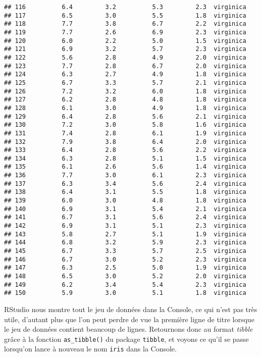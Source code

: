 \documentclass[
]{book}
\begin{document}
\begin{verbatim}
## 116          6.4         3.2          5.3         2.3  virginica
## 117          6.5         3.0          5.5         1.8  virginica
## 118          7.7         3.8          6.7         2.2  virginica
## 119          7.7         2.6          6.9         2.3  virginica
## 120          6.0         2.2          5.0         1.5  virginica
## 121          6.9         3.2          5.7         2.3  virginica
## 122          5.6         2.8          4.9         2.0  virginica
## 123          7.7         2.8          6.7         2.0  virginica
## 124          6.3         2.7          4.9         1.8  virginica
## 125          6.7         3.3          5.7         2.1  virginica
## 126          7.2         3.2          6.0         1.8  virginica
## 127          6.2         2.8          4.8         1.8  virginica
## 128          6.1         3.0          4.9         1.8  virginica
## 129          6.4         2.8          5.6         2.1  virginica
## 130          7.2         3.0          5.8         1.6  virginica
## 131          7.4         2.8          6.1         1.9  virginica
## 132          7.9         3.8          6.4         2.0  virginica
## 133          6.4         2.8          5.6         2.2  virginica
## 134          6.3         2.8          5.1         1.5  virginica
## 135          6.1         2.6          5.6         1.4  virginica
## 136          7.7         3.0          6.1         2.3  virginica
## 137          6.3         3.4          5.6         2.4  virginica
## 138          6.4         3.1          5.5         1.8  virginica
## 139          6.0         3.0          4.8         1.8  virginica
## 140          6.9         3.1          5.4         2.1  virginica
## 141          6.7         3.1          5.6         2.4  virginica
## 142          6.9         3.1          5.1         2.3  virginica
## 143          5.8         2.7          5.1         1.9  virginica
## 144          6.8         3.2          5.9         2.3  virginica
## 145          6.7         3.3          5.7         2.5  virginica
## 146          6.7         3.0          5.2         2.3  virginica
## 147          6.3         2.5          5.0         1.9  virginica
## 148          6.5         3.0          5.2         2.0  virginica
## 149          6.2         3.4          5.4         2.3  virginica
## 150          5.9         3.0          5.1         1.8  virginica
\end{verbatim}

RStudio nous montre tout le jeu de données dans la Console, ce qui n'est pas très utile, d'autant plus que l'on peut perdre de vue la première ligne de titre lorsque le jeu de données contient beaucoup de lignes. Retournons donc au format \emph{tibble} grâce à la fonction \texttt{as\_tibble()} du package \texttt{tibble}, et voyons ce qu'il se passe lorsqu'on lance à nouveau le nom \texttt{iris} dans la Console.
\end{document}
